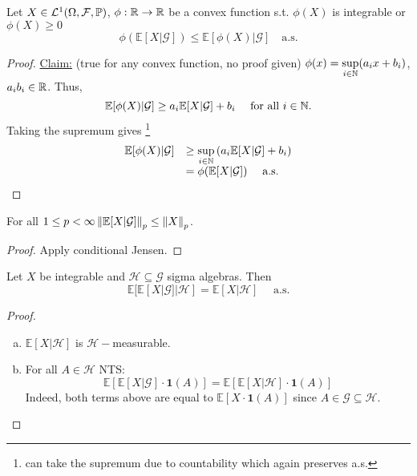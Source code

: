 \documentclass{article}
\begin{document}
\begin{theorem}\label{thm: cond jensen}
Let $ X\in\mathcal{L}^{1}(\Omega, \mathcal{F}, \mathbb{P})$, $ \phi:\mathbb{R}\to \mathbb{R}$ be a convex function s.t. $ \phi(X)$ is integrable or $ \phi(X)\geq 0 $
\[
	\phi(\mathbb{E}[X|\mathcal{G}])\leq\mathbb{E}[\phi(X)|\mathcal{G}] \quad \text{a.s.}
\]
\end{theorem}

\begin{proof}
	\underline{Claim:} (true for any convex function, no proof given) $ \phi(x)=\displaystyle\sup_{i\in\mathbb{N}}(a_{i}x+b_{i})$, $ a_{i}b_{i}\in\mathbb{R}$. 
Thus, 
\[
	\mathbb{E}[\phi(X)|\mathcal{G}]\geq a_{i}\mathbb{E}[X|\mathcal{G}]+b_{i} \quad \text{ for all } i\in \mathbb{N}.
\]
Taking the supremum gives \footnote{can take the supremum due to countability which again preserves a.s.}
\[
\begin{array}{ll}
      
	\mathbb{E}[\phi(X)|\mathcal{G}]&\geq \displaystyle\sup_{i\in \mathbb{N}} \left(  a_{i}\mathbb{E}[X|\mathcal{G}]+b_{i}  \right)\\ 
				       &= \phi(\mathbb{E}[X|\mathcal{G}]) \quad \text{ a.s.}
\end{array}
\]

\end{proof}

\begin{boxcor}\label{cor: norm contraction cond exp}
	For all $ 1\leq p <\infty \left\lVert\mathbb{E}[X|\mathcal{G}]\right\rVert_{p}\leq \left\lVert X\right\rVert_{p}$.
\end{boxcor}

\begin{proof}
    Apply conditional Jensen.
\end{proof}

\begin{boxprop}\label{prop: tower ppty}
Let $ X$ be integrable and $\mathcal{H}\subseteq\mathcal{G}$ sigma algebras. Then 
\[
	\mathbb{E}[\mathbb{E}[X|\mathcal{G}]|\mathcal{H}]=\mathbb{E}[X|\mathcal{H}] \quad \text{ a.s.}
\]

\end{boxprop}

\begin{proof}
	\begin{enumerate}[(a)]
		\item $\mathbb{E}[X|\mathcal{H}] $ is $\mathcal{H}-$measurable.
		\item For all $ A\in\mathcal{H}$ NTS: 
			\[
				\mathbb{E}[\mathbb{E}[X|\mathcal{G}]\cdot\mathbf{1}(A)] =\mathbb{E}[\mathbb{E}[X|\mathcal{H}]\cdot\mathbf{1}(A)]
			\]
			Indeed, both terms above are equal to $\mathbb{E}[X\cdot\mathbf{1}(A)]$ since $ A\in\mathcal{G}\subseteq\mathcal{H}$.
			
    \end{enumerate}
    
\end{proof}
\end{document}
